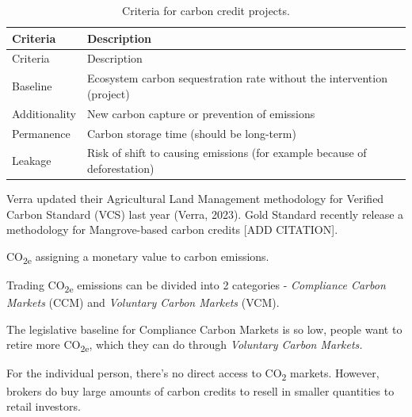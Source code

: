 \documentclass[
  letterpaper,
  DIV=11,
  numbers=noendperiod]{scrartcl}
\begin{document}
\begin{longtable}[]{@{}
  >{\raggedright\arraybackslash}p{}
  >{\raggedright\arraybackslash}p{}@{}}
\caption{Criteria for carbon credit projects.}\tabularnewline
\toprule\noalign{}
\begin{minipage}[b]{\linewidth}\raggedright
Criteria
\end{minipage} & \begin{minipage}[b]{\linewidth}\raggedright
Description
\end{minipage} \\
\midrule\noalign{}
\endfirsthead
\toprule\noalign{}
\begin{minipage}[b]{\linewidth}\raggedright
Criteria
\end{minipage} & \begin{minipage}[b]{\linewidth}\raggedright
Description
\end{minipage} \\
\midrule\noalign{}
\endhead
\bottomrule\noalign{}
\endlastfoot
Baseline & Ecosystem carbon sequestration rate without the intervention
(project) \\
Additionality & New carbon capture or prevention of emissions \\
Permanence & Carbon storage time (should be long-term) \\
Leakage & Risk of shift to causing emissions (for example because of
deforestation) \\
\end{longtable}

Verra updated their Agricultural Land Management methodology for
Verified Carbon Standard (VCS) last year (Verra, 2023). Gold Standard
recently release a methodology for Mangrove-based carbon credits {[}ADD
CITATION{]}.

CO\textsubscript{2e} assigning a monetary value to carbon emissions.

Trading CO\textsubscript{2e} emissions can be divided into 2 categories
- \emph{Compliance Carbon Markets} (CCM) and \emph{Voluntary Carbon
Markets} (VCM).

The legislative baseline for Compliance Carbon Markets is so low, people
want to retire more CO\textsubscript{2e}, which they can do through
\emph{Voluntary Carbon Markets.}

For the individual person, there's no direct access to
CO\textsubscript{2} markets. However, brokers do buy large amounts of
carbon credits to resell in smaller quantities to retail investors.
\end{document}
